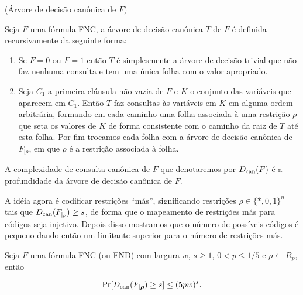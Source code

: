 \begin{defi} (Árvore de decisão canônica de $F$) \label{can_tree}

Seja $F$ uma fórmula FNC, a árvore de decisão canônica $T$ de $F$ é definida recursivamente da seguinte forma:

\begin{enumerate}

	\item Se $F = 0$ ou $F = 1$ então $T$ é simplesmente a árvore de decisão trivial que não faz nenhuma consulta e tem uma única folha com o valor apropriado.
	
	\item Seja $C_{1}$ a primeira cláusula não vazia de $F$ e $K$ o conjunto das variáveis que aparecem em $C_{1}$. Então $T$ faz consultas às variáveis em $K$ em alguma ordem arbitrária, formando em cada caminho uma folha associada à uma restrição $\rho$ que seta os valores de $K$ de forma consistente com o caminho da raiz de $T$ até esta folha. Por fim trocamos cada folha com a árvore de decisão canônica de $F_{\lvert \rho}$, em que $\rho$ é a restrição associada à folha.

\end{enumerate}

\end{defi}

\begin{defi} \label{can_depth}

A complexidade de consulta canônica de $F$ que denotaremos por $D_{\text{can}}(F)$ é a profundidade da árvore de decisão canônica de $F$.

\end{defi}

A idéia agora é codificar restrições ``más'', significando restrições $\rho \in \{*, 0, 1\}^{n}$ tais que $D_{\text{can}}(F_{\lvert \rho}) \geq s$, de forma que o mapeamento de restrições más para códigos seja injetivo. Depois disso mostramos que o número de possíveis códigos é pequeno dando então um limitante superior para o número de restrições más.

\begin{lema} \label{hastad_lemma_can_trees}

Seja $F$ uma fórmula FNC (ou FND) com largura $w$, $s \geq 1$, $0 < p \leq 1/5$ e $\rho \leftarrow R_{p}$, então

\begin{equation*}
	\Pr[D_{\text{can}}(F_{\lvert \boldsymbol{\rho}}) \geq s] \leq (5pw)^{s}.
\end{equation*}

\end{lema}

